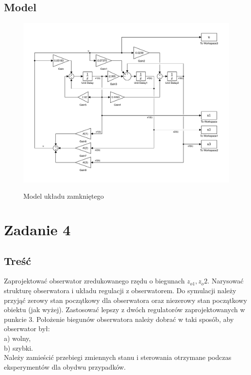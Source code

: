 \documentclass{article}
\begin{document}
\subsection{Model}
\begin{figure}[H]
\includegraphics[clip, trim=0.5cm 0.5cm 0.5cm 0.5cm, width=1.00\textwidth]{../rys/zad3_model.pdf}
\label{fig:zad3mod}
\caption{Model układu zamkniętego}
\end{figure}
\newpage
\section{Zadanie 4}
\subsection{Treść}
Zaprojektować obserwator zredukowanego rzędu o biegunach $z_{o1}, z{_o2}$. Narysować strukturę
obserwatora i układu regulacji z obserwatorem. Do symulacji należy przyjąć zerowy stan 
początkowy dla obserwatora oraz niezerowy stan początkowy obiektu (jak wyżej).
Zastosować lepszy z dwóch regulatorów zaprojektowanych w punkcie 3. Położenie
biegunów obserwatora należy dobrać w taki sposób, aby obserwator był:\\
a) wolny,\\
b) szybki.\\
Należy zamieścić przebiegi zmiennych stanu i sterowania otrzymane podczas
eksperymentów dla obydwu przypadków.
\end{document}
